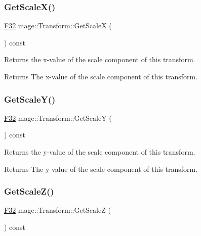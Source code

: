 \subsubsection{\texorpdfstring{Get\+Scale\+X()}{GetScaleX()}}
{\footnotesize\ttfamily \hyperlink{namespacemage_aa97e833b45f06d60a0a9c4fc22ae02c0}{F32} mage\+::\+Transform\+::\+Get\+ScaleX (\begin{DoxyParamCaption}{ }\end{DoxyParamCaption}) const\hspace{0.3cm}{\ttfamily [noexcept]}}

Returns the x-\/value of the scale component of this transform.

\begin{DoxyReturn}{Returns}
The x-\/value of the scale component of this transform. 
\end{DoxyReturn}
\hypertarget{structmage_1_1_transform_a17bd579657e31fbdc1eacec0836140c5}{}\label{structmage_1_1_transform_a17bd579657e31fbdc1eacec0836140c5} 
\subsubsection{\texorpdfstring{Get\+Scale\+Y()}{GetScaleY()}}
{\footnotesize\ttfamily \hyperlink{namespacemage_aa97e833b45f06d60a0a9c4fc22ae02c0}{F32} mage\+::\+Transform\+::\+Get\+ScaleY (\begin{DoxyParamCaption}{ }\end{DoxyParamCaption}) const\hspace{0.3cm}{\ttfamily [noexcept]}}

Returns the y-\/value of the scale component of this transform.

\begin{DoxyReturn}{Returns}
The y-\/value of the scale component of this transform. 
\end{DoxyReturn}
\hypertarget{structmage_1_1_transform_aa7ba1aa16161ec656b2828c2433f6dbd}{}\label{structmage_1_1_transform_aa7ba1aa16161ec656b2828c2433f6dbd} 
\subsubsection{\texorpdfstring{Get\+Scale\+Z()}{GetScaleZ()}}
{\footnotesize\ttfamily \hyperlink{namespacemage_aa97e833b45f06d60a0a9c4fc22ae02c0}{F32} mage\+::\+Transform\+::\+Get\+ScaleZ (\begin{DoxyParamCaption}{ }\end{DoxyParamCaption}) const\hspace{0.3cm}{\ttfamily [noexcept]}}

